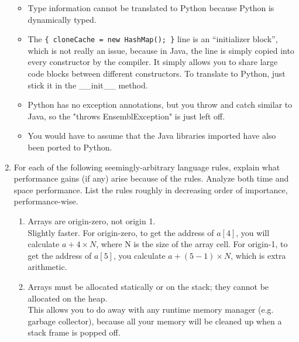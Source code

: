 \documentclass[10pt]{article}
\begin{document}
\begin{enumerate}
\begin{itemize}
                \item Type information cannot be translated to Python because Python is
                dynamically typed.

                \item The \texttt{\{ cloneCache = new HashMap(); \}} line is an ``initializer block'', which
                is not really an issue, because in Java, the line is simply copied into
                every constructor by the compiler. It simply allows you to share large
                code blocks between different constructors. To translate to Python, just
                stick it in the \_\_init\_\_ method.

                \item Python has no exception annotations, but you throw and catch similar to
                Java, so the "throws EnsemblException" is just left off.

                \item You would have to assume that the Java libraries imported have also been
                ported to Python.
        \end{itemize}

        \item For each of the following seemingly-arbitrary language rules, explain what performance gains (if any) arise because of the
        rules. Analyze both time and space performance. List the rules roughly in decreasing order of importance, performance-wise.

        \begin{enumerate}
                \item Arrays are origin-zero, not origin 1.\\

                Slightly faster. For origin-zero, to get the address of \(a[4]\), you will calculate \(a + 4\times N\), where N is the size of the array cell. For
                origin-1, to get the address of \(a[5]\), you calculate \(a + (5-1)\times N\), which is extra arithmetic.

                \item Arrays must be allocated statically or on the stack; they cannot be allocated on the heap.\\

                This allows you to do away with any runtime memory manager (e.g. garbage collector), because all your memory will
                be cleaned up when a stack frame is popped off.


\end{enumerate}
\end{enumerate}
\end{document}
